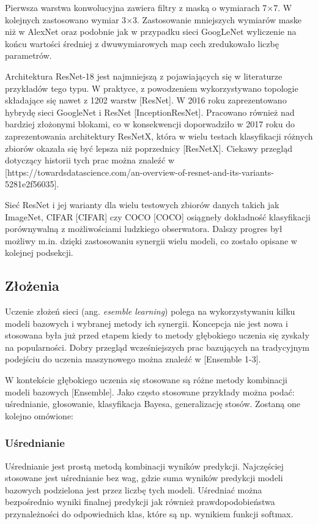 Pierwsza warstwa konwolucyjna zawiera filtry z maską o wymiarach 7$\times$7. W kolejnych zastosowano wymiar 3$\times$3. Zastosowanie mniejszych wymiarów maske niż w AlexNet oraz podobnie jak w przypadku sieci GoogLeNet wyliczenie na końcu wartości średniej z dwuwymiarowych map cech zredukowało liczbę parametrów.

Architektura ResNet-18 jest najmniejszą z pojawiających się w literaturze przykładów tego typu. W praktyce, z powodzeniem wykorzystywano topologie składające się nawet z 1202 warstw [ResNet]. W 2016 roku zaprezentowano hybrydę sieci GoogleNet i ResNet [InceptionResNet]. Pracowano również nad bardziej złożonymi blokami, co w konsekwencji doporwadziło w 2017 roku do zaprezentowania architektury ResNetX, która w wielu testach klasyfikacji różnych zbiorów okazała się być lepsza niż poprzednicy [ResNetX]. Ciekawy przegląd dotyczący historii tych prac można znaleźć w [https://towardsdatascience.com/an-overview-of-resnet-and-its-variants-5281e2f56035].

Sieć ResNet i jej warianty dla wielu testowych zbiorów danych takich jak ImageNet, CIFAR [CIFAR] czy COCO [COCO] osiągneły dokładność klasyfikacji porównywalną z możliwościami ludzkiego obserwatora. Dalszy progres był możliwy m.in. dzięki zastosowaniu synergii wielu modeli, co zostało opisane w kolejnej podsekcji.

\subsection{Złożenia}
Uczenie złożeń sieci (ang. \textit{esemble learning}) polega na wykorzystywaniu kilku modeli bazowych i wybranej metody ich synergii. Koncepcja nie jest nowa i stosowana była już przed etapem kiedy to metody głębokiego uczenia się zyskały na popularności. Dobry przegląd wcześniejszych prac bazujących na tradycyjnym podejściu do uczenia maszynowego można znaleźć w  [Ensemble 1-3].

W kontekście głębokiego uczenia się stosowane są różne metody kombinacji modeli bazowych [Ensemble]. Jako często stosowane przykłady można podać: uśrednianie, głosowanie, klasyfikacja Bayesa, generalizację stosów. Zostaną one kolejno omówione:

\subsubsection{Uśrednianie}
Uśrednianie jest prostą metodą kombinacji wyników predykcji. Najczęściej stosowane jest uśrednianie bez wag, gdzie suma wyników predykcji modeli bazowych podzielona jest przez liczbę tych modeli. Uśredniać można bezpośrednio wyniki finalnej predykcji jak również prawdopodobieństwa przynależności do odpowiednich klas, które są np. wynikiem funkcji softmax. 

